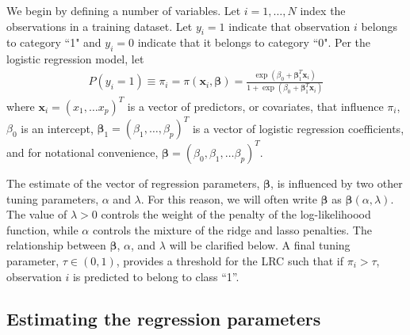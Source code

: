 \documentclass{article}
\begin{document}
We begin by defining a
number of variables.  Let $i = 1,\ldots,N$ index the observations in a training dataset. 
Let $y_i = 1$ indicate that observation $i$ belongs to category ``1" and $y_i = 0$ indicate
that it belongs to category ``0".  Per the logistic regression model, let  
\begin{align}
P(y_i = 1) \equiv \pi_i = \pi(\mathbf{x}_i, \boldsymbol{\beta}) = 
\frac{\exp(\beta_0 + \boldsymbol{\beta}_1^T \mathbf{x}_i)}{1+\exp(\beta_0 + \boldsymbol{\beta}_1^T \mathbf{x}_i)}
\end{align}
\noindent where $\mathbf{x}_i = (x_1, \ldots x_p)^T$ is a vector of predictors, or covariates, that
influence $\pi_i$, $\beta_0$ is an intercept, $\boldsymbol{\beta}_1 = (\beta_1, \ldots, \beta_p)^T$ is a 
vector of  logistic regression coefficients, and for notational convenience, 
$\boldsymbol{\beta} = (\beta_0, \beta_1, \ldots \beta_p)^T$. 

The estimate of the vector of regression parameters, $\boldsymbol{\beta}$, is influenced by two other tuning parameters, 
$\alpha$ and $\lambda$.  For this reason, we will often write $\boldsymbol\beta$ as $\boldsymbol\beta(\alpha,\lambda)$.  
The value of $\lambda > 0$ controls the weight of the
penalty of the log-likelihoood function, while $\alpha$ controls the mixture of the ridge and lasso penalties.  
The relationship between $\boldsymbol{\beta}$, $\alpha$, and $\lambda$ will be clarified below.  A final tuning parameter, 
$\tau \in (0, 1)$, provides a threshold for the LRC such that if $\pi_i > \tau$, observation $i$ is predicted to belong
to class ``1''.

\subsection{Estimating the regression parameters}
\end{document}
